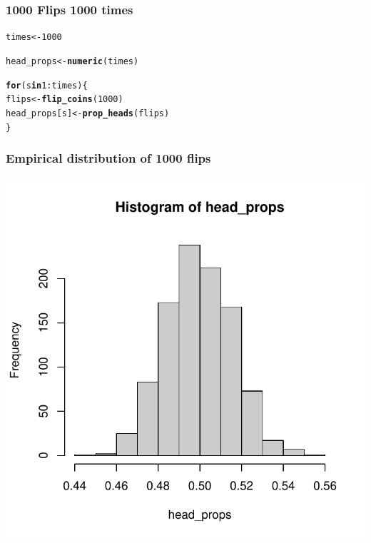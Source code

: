 \documentclass[12pt]{beamer}\usepackage[]{graphicx}\usepackage[]{color}
\makeatletter
\newcommand{\hlnum}[1]{\textcolor[rgb]{0.686,0.059,0.569}{#1}}%
\newcommand{\hlopt}[1]{\textcolor[rgb]{0,0,0}{#1}}%
\newcommand{\hlstd}[1]{\textcolor[rgb]{0.345,0.345,0.345}{#1}}%
\newcommand{\hlkwa}[1]{\textcolor[rgb]{0.161,0.373,0.58}{\textbf{#1}}}%
\newcommand{\hlkwb}[1]{\textcolor[rgb]{0.69,0.353,0.396}{#1}}%
\newcommand{\hlkwd}[1]{\textcolor[rgb]{0.737,0.353,0.396}{\textbf{#1}}}%
\newenvironment{kframe}{%
 \def\at@end@of@kframe{}%
 \ifinner\ifhmode%
  \def\at@end@of@kframe{\end{minipage}}%
  \begin{minipage}{\columnwidth}%
 \fi\fi%
 \def\FrameCommand##1{\hskip\@totalleftmargin \hskip-\fboxsep
 \colorbox{shadecolor}{##1}\hskip-\fboxsep
     \hskip-\linewidth \hskip-\@totalleftmargin \hskip\columnwidth}%
 \MakeFramed {\advance\hsize-\width
   \@totalleftmargin\z@ \linewidth\hsize
   \@setminipage}}%
 {\par\unskip\endMakeFramed%
 \at@end@of@kframe}
\newenvironment{knitrout}{}{} %
\makeatother
\begin{document}

\begin{frame}[fragile]
\frametitle{1000 Flips 1000 times}

\begin{knitrout}\footnotesize
{}\color{fgcolor}\begin{kframe}
\begin{alltt}
\hlstd{times} \hlkwb{<-} \hlnum{1000}

\hlstd{head_props} \hlkwb{<-} \hlkwd{numeric}\hlstd{(times)}

\hlkwa{for} \hlstd{(s} \hlkwa{in} \hlnum{1}\hlopt{:}\hlstd{times) \{}
  \hlstd{flips} \hlkwb{<-} \hlkwd{flip_coins}\hlstd{(}\hlnum{1000}\hlstd{)}
  \hlstd{head_props[s]} \hlkwb{<-} \hlkwd{prop_heads}\hlstd{(flips)}
\hlstd{\}}
\end{alltt}
\end{kframe}
\end{knitrout}

\end{frame}


\begin{frame}[fragile]
\frametitle{Empirical distribution of 1000 flips}

\begin{knitrout}\footnotesize
{}\color{fgcolor}

{\centering \includegraphics[width=.7\linewidth,height=.7\linewidth]{figure/unnamed-chunk-13-1} 

}



\end{knitrout}

\end{frame}
\end{document}
